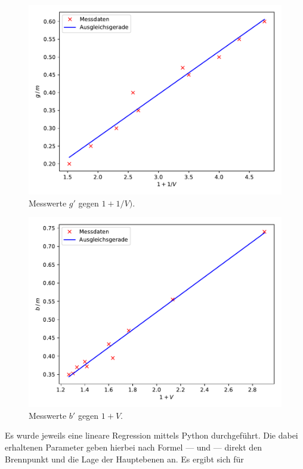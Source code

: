 \begin{figure}
  \centering
  \includegraphics{content/plot2.pdf}
  \caption{Messwerte $g'$ gegen $1+1/V)$.}
  \label{fig:plot2}
\end{figure}

\begin{figure}
  \centering
  \includegraphics{content/plot3.pdf}
  \caption{Messwerte $b'$ gegen $1+V$.}
  \label{fig:plot3}
\end{figure}

Es wurde jeweils eine lineare Regression mittels Python durchgeführt. Die dabei erhaltenen Parameter 
geben hierbei nach Formel --- und --- direkt den Brennpunkt und die Lage der Hauptebenen an. Es ergibt sich
für 

